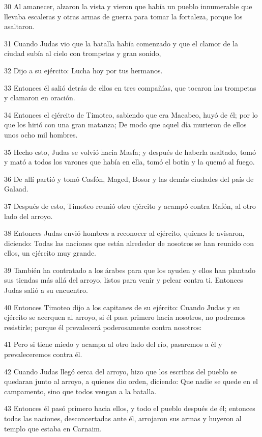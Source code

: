 \par 30 Al amanecer, alzaron la vista y vieron que había un pueblo innumerable que llevaba escaleras y otras armas de guerra para tomar la fortaleza, porque los asaltaron.
\par 31 Cuando Judas vio que la batalla había comenzado y que el clamor de la ciudad subía al cielo con trompetas y gran sonido,
\par 32 Dijo a su ejército: Lucha hoy por tus hermanos.
\par 33 Entonces él salió detrás de ellos en tres compañías, que tocaron las trompetas y clamaron en oración.
\par 34 Entonces el ejército de Timoteo, sabiendo que era Macabeo, huyó de él; por lo que los hirió con una gran matanza; De modo que aquel día murieron de ellos unos ocho mil hombres.
\par 35 Hecho esto, Judas se volvió hacia Masfa; y después de haberla asaltado, tomó y mató a todos los varones que había en ella, tomó el botín y la quemó al fuego.
\par 36 De allí partió y tomó Casfón, Maged, Bosor y las demás ciudades del país de Galaad.
\par 37 Después de esto, Timoteo reunió otro ejército y acampó contra Rafón, al otro lado del arroyo.
\par 38 Entonces Judas envió hombres a reconocer al ejército, quienes le avisaron, diciendo: Todas las naciones que están alrededor de nosotros se han reunido con ellos, un ejército muy grande.
\par 39 También ha contratado a los árabes para que los ayuden y ellos han plantado sus tiendas más allá del arroyo, listos para venir y pelear contra ti. Entonces Judas salió a su encuentro.
\par 40 Entonces Timoteo dijo a los capitanes de su ejército: Cuando Judas y su ejército se acerquen al arroyo, si él pasa primero hacia nosotros, no podremos resistirle; porque él prevalecerá poderosamente contra nosotros:
\par 41 Pero si tiene miedo y acampa al otro lado del río, pasaremos a él y prevaleceremos contra él.
\par 42 Cuando Judas llegó cerca del arroyo, hizo que los escribas del pueblo se quedaran junto al arroyo, a quienes dio orden, diciendo: Que nadie se quede en el campamento, sino que todos vengan a la batalla.
\par 43 Entonces él pasó primero hacia ellos, y todo el pueblo después de él; entonces todas las naciones, desconcertadas ante él, arrojaron sus armas y huyeron al templo que estaba en Carnaim.
